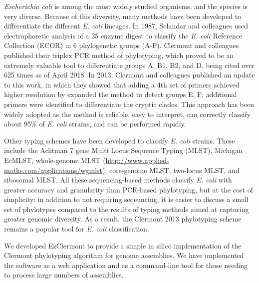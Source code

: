 \textit{Escherichia coli} is among the most widely studied organisms, and the species is very diverse\cite{Lukjancenko2010, Selander1987}.
Because of this diversity, many methods have been developed to differentiate the different  \textit{E. coli} lineages.  In 1987, Selandar  and colleagues used electrophoretic analysis of a 35 enzyme digest to classify the \textit{E. coli} Reference Collection (ECOR) in 6 phylogenetic groups (A-F)\cite{Selander1987}.  Clermont and colleagues published their triplex PCR method\cite{Clermont2000} of phylotyping, which proved to be an extremely valuable tool to differentiate groups A, B1, B2, and D, being cited over 625 times as of April 2018.  In 2013, Clermont and colleagues published an update to this work\cite{Clermont2013}, in which they showed that adding a 4th set of primers achieved higher resolution by expanded the method to detect groups E, F; additional primers were identified to differentiate the cryptic clades.  This approach has been widely adopted as the method is reliable, easy to interpret, can correctly classify about 95\% of \textit{E. coli} strains, and can be performed rapidly.

Other typing schemes have been developed to classify \textit{E. coli} strains. These include the Achtman 7 gene Multi Locus Sequence Typing (MLST)\cite{Achtman2012, Alikhan2018}, Michigan EcMLST\cite{Qi2004}, whole-genome MLST (\url{http://www.applied-maths.com/applications/wgmlst}), core-genome MLST\cite{DeBeen2015}, two-locus MLST\cite{Weissman2012}, and ribosomal MLST\cite{Jolley2012}. All these sequencing-based methods classify \textit{E. coli} with greater accuracy and granularity than PCR-based phylotyping, but at the cost of simplicity: in addition to not requiring seqeuncing, it is easier to discuss a small set of phylotypes compared to the results of typing methods aimed at capturing greater genomic diversity. As a result, the Clermont 2013 phylotyping scheme remains a popular tool for \textit{E. coli} classification.

We developed EzClermont to provide a simple in silico implementation of the Clermont phylotyping algorithm for genome assemblies. We have implemented the software as a web application and as a command-line tool for those needing to process large numbers of assemblies.

